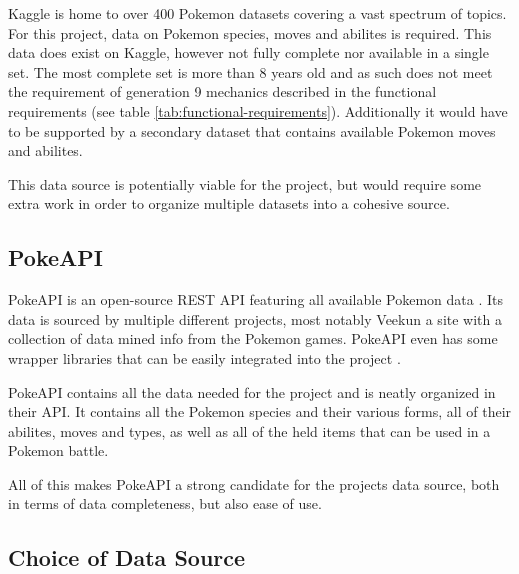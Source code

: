 Kaggle is home to over 400 Pokemon datasets \cite{PokemonKaggleDataSets} covering a vast spectrum of topics. For this project, data on Pokemon species,
moves and abilites is required. This data does exist on Kaggle, however not fully complete nor available in a single set. The most complete set \cite{PokemonDataSetWithStats} is 
more than 8 years old and as such does not meet the requirement of generation 9 mechanics described in the functional requirements (see table \ref{tab:functional-requirements}).
Additionally it would have to be supported by a secondary dataset that contains available Pokemon moves and abilites.

This data source is potentially viable for the project, but would require some extra work in order to organize multiple datasets into a cohesive source.

\subsection{PokeAPI}
PokeAPI is an open-source REST API featuring all available Pokemon data \cite{PokeAPI}. Its data is sourced by multiple different projects, most notably 
Veekun \cite{Veekun} a site with a collection of data mined info from the Pokemon games. PokeAPI even has some wrapper libraries that can be easily integrated
into the project \cite{PokeAPIWrapperLibs}. 

PokeAPI contains all the data needed for the project and is neatly organized in their API. It contains all the Pokemon species and their various forms, 
all of their abilites, moves and types, as well as all of the held items that can be used in a Pokemon battle. 

All of this makes PokeAPI a strong candidate for the projects data source, both in terms of data completeness, but also ease of use.


\subsection{Choice of Data Source}



